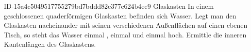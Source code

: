 \begin{exercise}
      {ID-15a4c5049517755279bd7bddd82c377c624b4ee9}
      {Glaskasten}
  \ifproblem\problem
    In einem geschlossenen quaderförmigen Glaskasten befinden sich 
    Wasser. Legt man den Glaskasten nacheinander mit seinen verschiedenen
    Außenflächen auf einen ebenen Tisch, so steht das Wasser einmal ,
    einmal  und einmal  hoch. Ermittle die inneren Kantenlängen
    des Glaskastens.
  \fi
\end{exercise}
